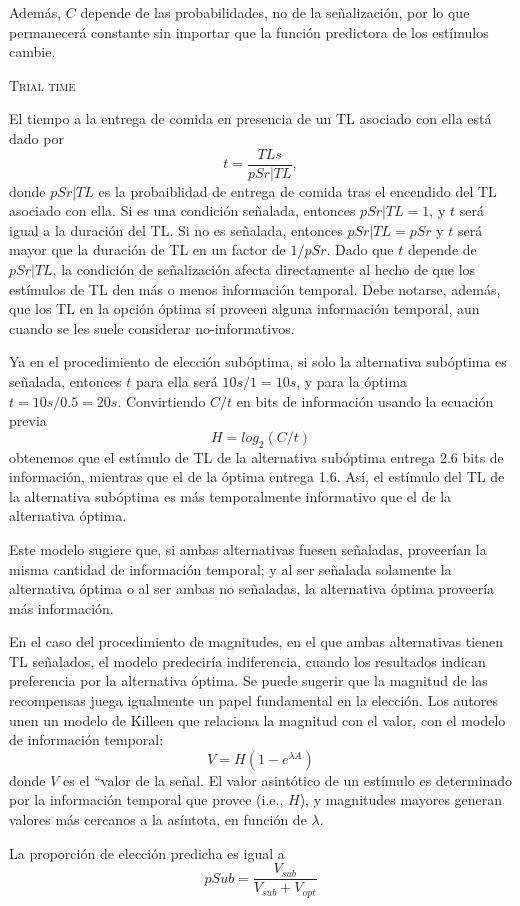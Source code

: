 \documentclass[a4paper,12pt]{article}
\begin{document}
Además, $C$ depende de las probabilidades, no de la señalización, por lo que permanecerá constante sin importar que la función predictora de los estímulos cambie.

{\scshape Trial time}

El tiempo a la entrega de comida en presencia de un TL asociado con ella está dado por
$$
t=\frac{TLs}{pSr|TL},
$$
donde $pSr|TL$ es la probaiblidad de entrega de comida tras el encendido del TL asociado con ella. Si es una condición señalada, entonces $pSr|TL=1$, y $t$ será igual a la duración del TL. Si no es señalada, entonces $pSr|TL=pSr$ y $t$ será mayor que la duración de TL en un factor de $1/pSr$. Dado que $t$ depende de $pSr|TL$, la condición de señalización afecta directamente al hecho de que los estímulos de TL den más o menos información temporal. Debe notarse, además, que los TL en la opción óptima sí proveen alguna información temporal, aun cuando se les suele considerar no-informativos.

Ya en el procedimiento de elección subóptima, si solo la alternativa subóptima es señalada, entonces $t$ para ella será $10s/1=10s$, y para la óptima $t=10s/0{.}5=20s$. Convirtiendo $C/t$ en bits de información usando la ecuación previa 
$$
H=log_2(C/t)
$$
obtenemos que el estímulo de TL de la alternativa subóptima entrega 2.6 bits de información, mientras que el de la óptima entrega 1.6. Así, el estímulo del TL de la alternativa subóptima es más temporalmente informativo que el de la alternativa óptima.

Este modelo sugiere que, si ambas alternativas fuesen señaladas, proveerían la misma cantidad de información temporal; y al ser señalada solamente la alternativa óptima o al ser ambas no señaladas, la alternativa óptima proveería más información.

En el caso del procedimiento de magnitudes, en el que ambas alternativas tienen TL señalados, el modelo predeciría indiferencia, cuando los resultados indican preferencia por la alternativa óptima. Se puede sugerir que la magnitud de las recompensas juega igualmente un papel fundamental en la elección. Los autores unen un modelo de Killeen que relaciona la magnitud con el valor, con el modelo de información temporal:
$$
V=H(1-e^{\lambda A})
$$
donde $V$ es el ``valor de la señal. El valor asintótico de un estímulo es determinado por la información temporal que provee (i.e., $H$), y magnitudes mayores generan valores más cercanos a la asíntota, en función de $\lambda$.

La proporción de elección predicha es igual a
$$
pSub=\frac{V_{sub}}{V_{sub}+V_{opt}}
$$
\end{document}
